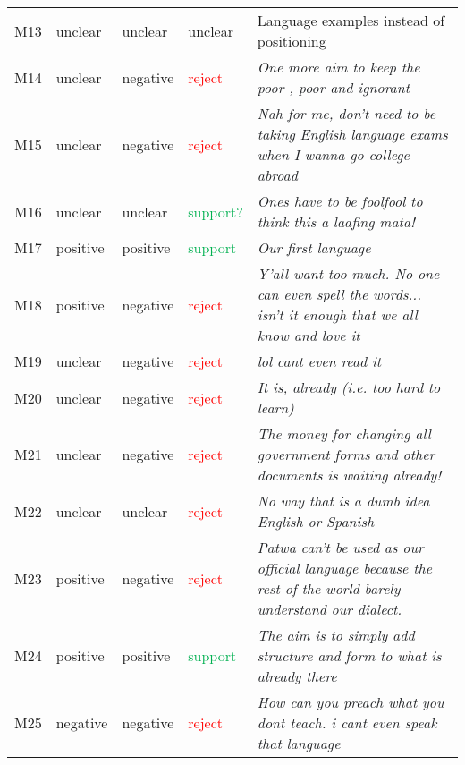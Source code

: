 \documentclass[output=paper,colorlinks,citecolor=brown]{langscibook}
\begin{document}
\begin{longtable}{llllp{6cm}}
 {M13} & {unclear} & {unclear} & {unclear} & {Language examples instead of positioning} \\
 {M14} & {unclear} & {negative} & {\textcolor[HTML]{FF0000}{reject}} & {\textit{\textcolor[HTML]{1C1E21}{One more aim to keep the poor , poor and ignorant}}} \\
 {M15} & {unclear} & {negative} & {\textcolor[HTML]{FF0000}{reject}} & {\textit{\textcolor[HTML]{1C1E21}{Nah for me, don’t need to be taking English language exams when I wanna go college abroad}}} \\
 {M16} & {unclear} & {unclear} & {\textcolor[HTML]{00B050}{support?}} & {\textit{\textcolor[HTML]{1C1E21}{Ones have to be foolfool to think this a laafing mata!}}} \\
 {M17} & {positive} & {positive} & {\textcolor[HTML]{00B050}{support}} & {\textit{\textcolor[HTML]{1C1E21}{Our first language}}} \\
 {M18} & {positive} & {negative} & {\textcolor[HTML]{FF0000}{reject}} & {\textit{\textcolor[HTML]{1C1E21}{Y'all want too much. No one can even spell the words... isn't it enough that we all know and love it}}} \\
 {M19} & {unclear} & {negative} & {\textcolor[HTML]{FF0000}{reject}} & {\textit{\textcolor[HTML]{1C1E21}{lol cant even read it}}} \\
 {M20} & {unclear} & {negative} & {\textcolor[HTML]{FF0000}{reject}} & {\textit{\textcolor[HTML]{1C1E21}{It is, already (i.e. too hard to learn)}}} \\
 {M21} & {unclear} & {negative} & {\textcolor[HTML]{FF0000}{reject}} & {\textit{\textcolor[HTML]{1C1E21}{The money for changing all government forms and other documents is waiting already!}}} \\
 {M22} & {unclear} & {unclear} & {\textcolor[HTML]{FF0000}{reject}} & {\textit{\textcolor[HTML]{1C1E21}{No way that is a dumb idea English or Spanish}}} \\
 {M23} & {positive} & {negative} & {\textcolor[HTML]{FF0000}{reject}} & {\textit{\textcolor[HTML]{1C1E21}{Patwa can't be used as our official language because the rest of the world barely understand our dialect.}}} \\
 {M24} & {positive} & {positive} & {\textcolor[HTML]{00B050}{support}} & {\textit{\textcolor[HTML]{1C1E21}{The aim is to simply add structure and form to what is already there}}} \\
 {M25} & {negative} & {negative} & {\textcolor[HTML]{FF0000}{reject}} & {\textit{\textcolor[HTML]{1C1E21}{How can you preach what you dont teach. i cant even speak that language}}} \\

\end{longtable}
\end{document}
